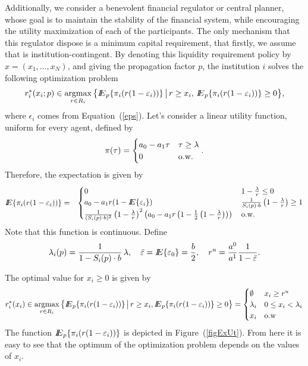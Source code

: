 Additionally, we consider a benevolent financial regulator or central planner, whose goal is to maintain the stability of the financial system, while encouraging the utility maximization of each of the participants.  The only mechanism that this regulator dispose is a minimum capital requirement, that firstly, we assume that is institution-contingent.  By denoting this liquidity requirement policy by $x=(x_1,\ldots,x_N)$, and giving the propagation factor $p$, the institution $i$ solves the following optimization problem
\begin{equation}\label{imax}
r^*_i(x_i;p)\in\mathop{\rm argmax}_{r\in R_i} \big\lbrace {I\kern-.35em E}_p\{ \pi_i(r(1-\varepsilon_i))\} {\,\big\vert\,} r\geq x_i,\,{I\kern-.35em E}_p\{\pi_i(r(1-\varepsilon_i))\}\geq 0\big\rbrace,
\end{equation}
where $\epsilon_i$ comes from Equation~(\ref{eps}).  Let's consider a linear utility function, uniform for every agent, defined by
\[\pi(\tau)=\begin{cases} a_0-a_1\tau&\tau\geq \lambda\\ 0 & {\rm o.w.}\end{cases}.\]
Therefore, the expectation is given by
\begin{eqnarray*}
{I\kern-.35em E}\{ \pi_i(r(1-\varepsilon_i))\}&=&\begin{cases}
0&1-\frac{\lambda}{r}\leq 0\\
a_0-a_1r(1-{I\kern-.35em E}\{\varepsilon_i\})&\frac{1}{S_i(p)\cdot b}\left(1-\frac{\lambda}{r}\right)\geq 1\\
\frac{1}{(S_i(p)\cdot b)^2}\left(1-\frac{\lambda}{r}\right)^2\left(a_0-a_1r\left(1-\frac{1}{2}\left(1-\frac{\lambda}{r}\right)\right)\right)\,&{\rm o.w.}
\end{cases}
\end{eqnarray*}
Note that this function is continuous.  Define 
\[\lambda_i(p)=\frac{1}{1-S_i(p)\cdot b}\,\lambda, \quad \bar{\varepsilon}={I\kern-.35em E}\{\varepsilon_0\}=\frac{b}{2},\quad r^u=\frac{a^0}{a^1}\frac{1}{1-\bar{\varepsilon}}.\]

The optimal value for $x_i\geq 0$ is given by
\begin{equation}\label{optri}
r_i^*(x_i)\in\mathop{\rm argmax}_{r\in R_i} \big\lbrace {I\kern-.35em E}_p\{ \pi_i(r(1-\varepsilon_i))\}{\,\big\vert\,} r\geq x_i, {I\kern-.35em E}_p\{ \pi_i(r(1-\varepsilon_i))\}\geq 0\big\rbrace = \begin{cases}
\emptyset & x_i\geq r^u\\
\lambda_i& 0\leq x_i<\lambda_i\\
x_i& \mbox{o.w}\end{cases}
\end{equation}
The function ${I\kern-.35em E}_p\{ \pi_i(r(1-\varepsilon_i))\}$ is depicted in Figure~(\ref{figExUt}).  From here it is easy to see that the optimum of the optimization problem depends on the values of $x_i$.

